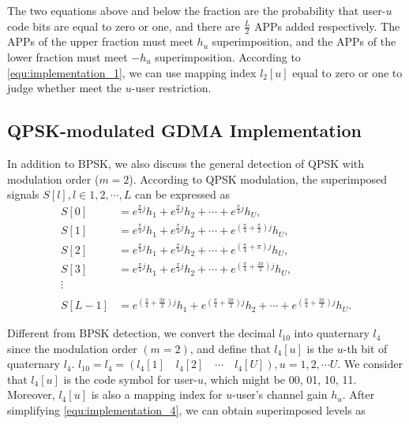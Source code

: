 The two equations above and below the fraction are the probability that user-$u$ code bits are equal to zero or one, and there are $\frac{L}{2}$ APPs added respectively. The APPs of the upper fraction must meet $h_u$ superimposition, and the APPs of the lower fraction must meet $-h_u$ superimposition. According to \ref{equ:implementation_1}, we can use mapping index $l_2[u]$ equal to zero or one to judge whether meet the $u$-user restriction.



\subsection{QPSK-modulated GDMA Implementation}

 In addition to BPSK, we also discuss the general detection of QPSK with modulation order ($m=2$). According to QPSK modulation, the superimposed signals $S[l],l\in{1,2,\cdots,L}$ can be expressed as
\begin{align}
S[0] &= e^{\frac{\pi}{4}j}h_{1} + e^{\frac{\pi}{4}j}h_{2} + \cdots + e^{\frac{\pi}{4}j}h_{U},
\nonumber \\
S[1] &= e^{\frac{\pi}{4}j}h_{1} + e^{\frac{\pi}{4}j}h_{2} + \cdots + e^{(\frac{\pi}{4}+\frac{\pi}{2})j}h_{U},
\nonumber \\
S[2] &= e^{\frac{\pi}{4}j}h_{1} + e^{\frac{\pi}{4}j}h_{2} + \cdots + e^{(\frac{\pi}{4}+\pi)j}h_{U},
\nonumber \\
S[3] &= e^{\frac{\pi}{4}j}h_{1} + e^{\frac{\pi}{4}j}h_{2} + \cdots + e^{(\frac{\pi}{4}+\frac{3\pi}{2})j}h_{U},
\nonumber \\
\vdots 
\nonumber \\ \nonumber \\
S[L-1] &= e^{(\frac{\pi}{4}+\frac{3\pi}{2})j}h_{1} + e^{(\frac{\pi}{4}+\frac{3\pi}{2})j}h_{2} + \cdots + e^{(\frac{\pi}{4}+\frac{3\pi}{2})j}h_{U}.
\label{equ:implementation_4}
\end{align}

Different from BPSK detection, we convert the decimal $l_{10}$ into quaternary $l_{4}$ since the modulation order $(m=2)$, and define that $l_{4}[u]$ is the $u$-th bit of quaternary $l_{4}$. $l_{10}=l_{4}=(l_4[1]  \quad l_4[2] \quad  \cdots \quad  l_4[U]),u=1,2,\cdots U$.  We consider that $l_4[u]$ is the code symbol for user-$u$, which might be 00, 01, 10, 11. Moreover, $l_4[u]$ is also a mapping index for $u$-user's channel gain $h_u$. After simplifying \ref{equ:implementation_4}, we can obtain superimposed levels as

